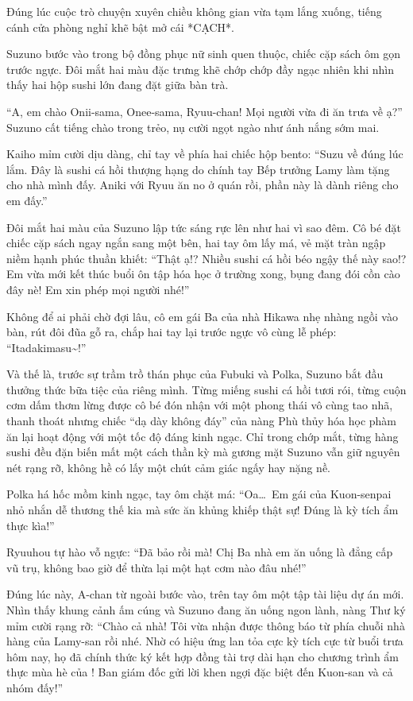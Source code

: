 \documentclass[../main.tex]{subfiles}
\begin{document}
\il

Đúng lúc cuộc trò chuyện xuyên chiều không gian vừa tạm lắng xuống, tiếng cánh cửa phòng nghỉ khẽ bật mở cái *CẠCH*.

Suzuno bước vào trong bộ đồng phục nữ sinh quen thuộc, chiếc cặp sách ôm gọn trước ngực. Đôi mắt hai màu đặc trưng khẽ chớp chớp đầy ngạc nhiên khi nhìn thấy hai hộp sushi lớn đang đặt giữa bàn trà.

``A, em chào Onii-sama, Onee-sama, Ryuu-chan! Mọi người vừa đi ăn trưa về ạ?'' Suzuno cất tiếng chào trong trẻo, nụ cười ngọt ngào như ánh nắng sớm mai.

Kaiho mỉm cười dịu dàng, chỉ tay về phía hai chiếc hộp bento: ``Suzu về đúng lúc lắm. Đây là sushi cá hồi thượng hạng do chính tay Bếp trưởng Lamy làm tặng cho nhà mình đấy. Aniki với Ryuu ăn no ở quán rồi, phần này là dành riêng cho em đấy.''

Đôi mắt hai màu của Suzuno lập tức sáng rực lên như hai vì sao đêm. Cô bé đặt chiếc cặp sách ngay ngắn sang một bên, hai tay ôm lấy má, vẻ mặt tràn ngập niềm hạnh phúc thuần khiết: ``Thật ạ!? Nhiều sushi cá hồi béo ngậy thế này sao!? Em vừa mới kết thúc buổi ôn tập hóa học ở trường xong, bụng đang đói cồn cào đây nè! Em xin phép mọi người nhé!''

Không để ai phải chờ đợi lâu, cô em gái Ba của nhà Hikawa nhẹ nhàng ngồi vào bàn, rút đôi đũa gỗ ra, chắp hai tay lại trước ngực vô cùng lễ phép: ``Itadakimasu\~{}!''

Và thế là, trước sự trầm trồ thán phục của Fubuki và Polka, Suzuno bắt đầu thưởng thức bữa tiệc của riêng mình. Từng miếng sushi cá hồi tươi rói, từng cuộn cơm dấm thơm lừng được cô bé đón nhận với một phong thái vô cùng tao nhã, thanh thoát nhưng chiếc ``dạ dày không đáy'' của nàng Phù thủy hóa học phàm ăn lại hoạt động với một tốc độ đáng kinh ngạc. Chỉ trong chớp mắt, từng hàng sushi đều đặn biến mất một cách thần kỳ mà gương mặt Suzuno vẫn giữ nguyên nét rạng rỡ, không hề có lấy một chút cảm giác ngấy hay nặng nề.

Polka há hốc mồm kinh ngạc, tay ôm chặt má: ``Oa\dots\ Em gái của Kuon-senpai nhỏ nhắn dễ thương thế kia mà sức ăn khủng khiếp thật sự! Đúng là kỳ tích ẩm thực kìa!''

Ryuuhou tự hào vỗ ngực: ``Đã bảo rồi mà! Chị Ba nhà em ăn uống là đẳng cấp vũ trụ, không bao giờ để thừa lại một hạt cơm nào đâu nhé!''

Đúng lúc này, A-chan từ ngoài bước vào, trên tay ôm một tập tài liệu dự án mới. Nhìn thấy khung cảnh ấm cúng và Suzuno đang ăn uống ngon lành, nàng Thư ký mỉm cười rạng rỡ: ``Chào cả nhà! Tôi vừa nhận được thông báo từ phía chuỗi nhà hàng của Lamy-san rồi nhé. Nhờ có hiệu ứng lan tỏa cực kỳ tích cực từ buổi trưa hôm nay, họ đã chính thức ký kết hợp đồng tài trợ dài hạn cho chương trình ẩm thực mùa hè của \hll! Ban giám đốc gửi lời khen ngợi đặc biệt đến Kuon-san và cả nhóm đấy!''
\end{document}
